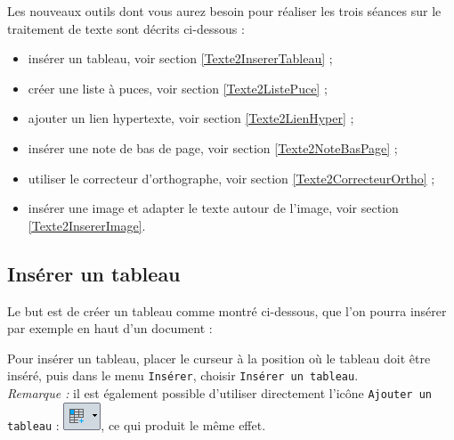 
Les nouveaux outils dont vous aurez besoin pour réaliser les trois séances sur le traitement de texte sont décrits ci-dessous :


\begin{itemize}   
\item insérer un tableau, voir section \vref{Texte2InsererTableau} ;
\item créer une liste à puces, voir section \vref{Texte2ListePuce} ;
\item ajouter un lien hypertexte, voir section \vref{Texte2LienHyper} ;
\item insérer une note de bas de page, voir section \vref{Texte2NoteBasPage} ;
\item utiliser le correcteur d'orthographe, voir section \vref{Texte2CorrecteurOrtho} ;
\item insérer une image et adapter le texte autour de l'image, voir section \vref{Texte2InsererImage}.
\end{itemize}  



\subsection{Insérer un tableau}\label{Texte2InsererTableau} 



Le but est de créer un tableau comme montré ci-dessous, que l'on pourra insérer par exemple en haut d'un document :



Pour insérer un tableau, placer le curseur à la position où le tableau doit être inséré, puis dans le menu \texttt{Insérer}, choisir \texttt{Insérer un tableau}.\\ \emph{Remarque :} il est également possible d'utiliser directement l'icône \texttt{Ajouter un tableau} : \includegraphics[width=.6cm]{./images/texte02/InsererTableauIcone}, ce qui produit le même effet.


